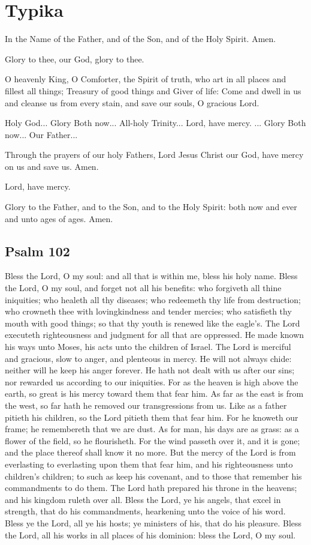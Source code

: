 \section{Typika}

In the Name of the Father, and of the Son, and of the Holy Spirit. Amen.

Glory to thee, our God, glory to thee.

O heavenly King, O Comforter, the Spirit of truth, who art in all places and fillest all things; Treasury of good things and Giver of life: Come and dwell in us and cleanse us from every stain, and save our souls, O gracious Lord.

Holy God... Glory  Both now... All-holy Trinity... Lord, have mercy. ... Glory  Both now... Our Father...

Through the prayers of our holy Fathers, Lord Jesus Christ our God, have mercy on us and save us. Amen.

Lord, have mercy. 

Glory to the Father, and to the Son, and to the Holy Spirit: both now and ever and unto ages of ages. Amen.

\subsection{Psalm 102}

 Bless the Lord, O my soul: and all that is within me, bless his holy name. Bless the Lord, O my soul, and forget not all his benefits: who forgiveth all thine iniquities; who healeth all thy diseases; who redeemeth thy life from destruction; who crowneth thee with lovingkindness and tender mercies; who satisfieth thy mouth with good things; so that thy youth is renewed like the eagle's. The Lord executeth righteousness and judgment for all that are oppressed. He made known his ways unto Moses, his acts unto the children of Israel. The Lord is merciful and gracious, slow to anger, and plenteous in mercy. He will not always chide: neither will he keep his anger forever. He hath not dealt with us after our sins; nor rewarded us according to our iniquities. For as the heaven is high above the earth, so great is his mercy toward them that fear him. As far as the east is from the west, so far hath he removed our transgressions from us. Like as a father pitieth his children, so the Lord pitieth them that fear him. For he knoweth our frame; he remembereth that we are dust. As for man, his days are as grass: as a flower of the field, so he flourisheth. For the wind passeth over it, and it is gone; and the place thereof shall know it no more. But the mercy of the Lord is from everlasting to everlasting upon them that fear him, and his righteousness unto children's children; to such as keep his covenant, and to those that remember his commandments to do them. The Lord hath prepared his throne in the heavens; and his kingdom ruleth over all. Bless the Lord, ye his angels, that excel in strength, that do his commandments, hearkening unto the voice of his word. Bless ye the Lord, all ye his hosts; ye ministers of his, that do his pleasure. Bless the Lord, all his works in all places of his dominion: bless the Lord, O my soul.

